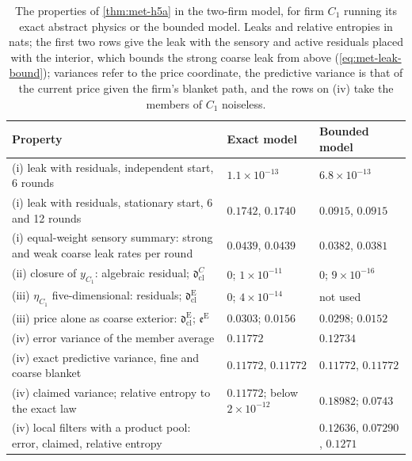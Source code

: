 
\begin{table}[t]
\centering\small
\caption{The properties of \cref{thm:met-h5a} in the two-firm model, for firm $C_1$ running its exact abstract physics or the bounded model. Leaks and relative entropies in nats; the first two rows give the leak with the sensory and active residuals placed with the interior, which bounds the strong coarse leak from above (\cref{eq:met-leak-bound}); variances refer to the price coordinate, the predictive variance is that of the current price given the firm's blanket path, and the rows on (iv) take the members of $C_1$ noiseless.}
\label{tab:met-firms}
\begin{tabular}{@{}>{\raggedright\arraybackslash}p{}>{\raggedright\arraybackslash}p{}>{\raggedright\arraybackslash}p{}@{}}
\toprule
Property & Exact model & Bounded model\\
\midrule
(i) leak with residuals, independent start, 6 rounds & $1.1\times10^{-13}$ & $6.8\times10^{-13}$\\
(i) leak with residuals, stationary start, 6 and 12 rounds & $0.1742$, $0.1740$ & $0.0915$, $0.0915$\\
(i) equal-weight sensory summary: strong and weak coarse leak rates per round & $0.0439$, $0.0439$ & $0.0382$, $0.0381$\\
(ii) closure of $y_{C_1}$: algebraic residual; $\mathfrak d^C_{\mathrm{cl}}$ & $0$; $1\times10^{-11}$ & $0$; $9\times10^{-16}$\\
(iii) $\eta_{C_1}$ five-dimensional: residuals; $\mathfrak d^{\mathrm E}_{\mathrm{cl}}$ & $0$; $4\times10^{-14}$ & not used\\
(iii) price alone as coarse exterior: $\mathfrak d^{\mathrm E}_{\mathrm{cl}}$; $\mathfrak e^{\mathrm E}$ & $0.0303$; $0.0156$ & $0.0298$; $0.0152$\\
(iv) error variance of the member average & $0.11772$ & $0.12734$\\
(iv) exact predictive variance, fine and coarse blanket & $0.11772$, $0.11772$ & $0.11772$, $0.11772$\\
(iv) claimed variance; relative entropy to the exact law & $0.11772$; below $2\times10^{-12}$ & $0.18982$; $0.0743$\\
(iv) local filters with a product pool: error, claimed, relative entropy & & $0.12636$, $0.07290$, $0.1271$\\
\bottomrule
\end{tabular}
\end{table}

